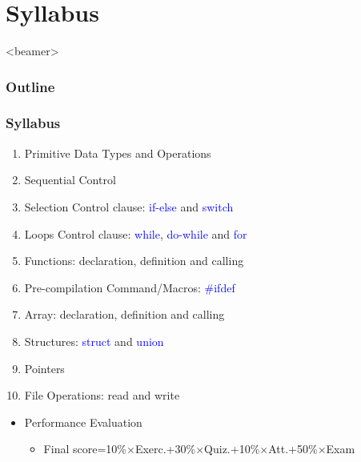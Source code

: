\section{Syllabus}
\label{sec:sylla}
\begin{frame}<beamer>
    \frametitle{Outline}
    \tableofcontents[currentsection]
\end{frame}

\begin{frame}
	\frametitle{Syllabus}
	\begin{enumerate}
		\item {Primitive Data Types and Operations}
		\item {Sequential Control}
		\item {Selection Control clause: \textcolor{blue}{if-else} and \textcolor{blue}{switch}}
		\item {Loops Control clause: \textcolor{blue}{while}, \textcolor{blue}{do-while} and \textcolor{blue}{for}}
		\item {Functions: declaration, definition and calling}
		\item {Pre-compilation Command/Macros: \textcolor{blue}{\#ifdef}}
		\item {Array: declaration, definition and calling}
		\item {Structures: \textcolor{blue}{struct} and \textcolor{blue}{union}}
		\item {Pointers}
		\item {File Operations: read and write}
	\end{enumerate}
	\begin{itemize}
		\item {Performance Evaluation}
		\begin{itemize}
			\item {Final score=10\%{$\times$}Exerc.+30\%{$\times$}Quiz.+10\%{$\times$}Att.+50\%{$\times$}Exam}
		\end{itemize}
	\end{itemize}
\end{frame}


